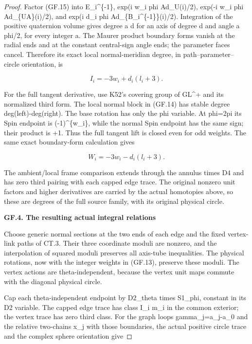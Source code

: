 \begin{proof}
Factor (GF.15) into E\_i\^{}\{-1\}, exp(i w\_i phi Ad\_U(i)/2),
exp(-i w\_i phi Ad\_\{UA\}(i)/2), and
exp(i d\_i phi Ad\_\{B\_i\^{}\{-1\}\}(i)/2). Integration of the positive
quaternion volume gives degree a d for an axis of degree d and
angle a phi/2, for every integer a. The Maurer product boundary
forms vanish at the radial ends and at the constant central-sign
angle ends; the parameter faces cancel. Therefore its exact local
normal-meridian degree, in path--parameter--circle orientation, is

\[
                         I_i=-3w_i+d_i(l_i+3).         \tag{GF.16}
\]

For the full tangent derivative, use K52's covering group of
GL\^{}+ and its normalized third form. The local normal block in
(GF.14) has stable degree deg(left)-deg(right). The base rotation
has only the phi variable. At phi=2pi its Spin endpoint is
(-1)\^{}\{w\_i\}, while the normal Spin endpoint has the same sign;
their product is +1. Thus the full tangent lift is closed even
for odd weights. The same exact boundary-form calculation gives

\[
                         W_i=-3w_i-d_i(l_i+3).         \tag{GF.17}
\]

The ambient/local frame comparison extends through the annulus
times D4 and has zero third pairing with each capped edge trace.
The original nonzero unit factors and higher derivatives are
carried by the actual homotopies above, so these are degrees of
the full source family, with its original physical circle.

\par

\medskip\noindent\textbf{GF.4. The resulting actual integral relations}

\par\nobreak

Choose generic normal sections at the two ends of each edge and
the fixed vertex-link paths of CT.3. Their three coordinate
moduli are nonzero, and the interpolation of squared moduli
preserves all axis-tube inequalities. The physical rotations,
now with the integer weights in (GF.13), preserve these moduli.
The vertex actions are theta-independent, because the vertex
unit maps commute with the diagonal physical circle.

Cap each theta-independent endpoint by D2\_theta times S1\_phi,
constant in its D2 variable. The capped edge trace has class
I\_i m\_i in the common exterior; the vertex trace has zero third
class. For the graph loops gamma\_j=a\_j-a\_0 and the relative
two-chains x\_j with those boundaries, the actual positive circle
trace and the complex sphere orientation give


\end{proof}

